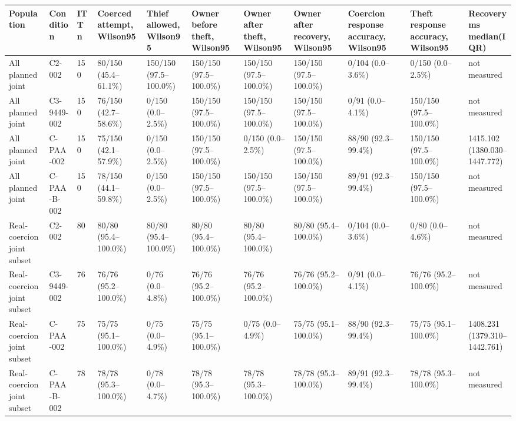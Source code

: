 \begin{tabular}{lllllllllll}
\hline
Population & Condition & ITT n & Coerced attempt, Wilson95 & Thief allowed, Wilson95 & Owner before theft, Wilson95 & Owner after theft, Wilson95 & Owner after recovery, Wilson95 & Coercion response accuracy, Wilson95 & Theft response accuracy, Wilson95 & Recovery ms median(IQR) \\
\hline
All planned joint & C2-002 & 150 & 80/150 (45.4--61.1\%) & 150/150 (97.5--100.0\%) & 150/150 (97.5--100.0\%) & 150/150 (97.5--100.0\%) & 150/150 (97.5--100.0\%) & 0/104 (0.0--3.6\%) & 0/150 (0.0--2.5\%) & not measured \\
All planned joint & C3-9449-002 & 150 & 76/150 (42.7--58.6\%) & 0/150 (0.0--2.5\%) & 150/150 (97.5--100.0\%) & 150/150 (97.5--100.0\%) & 150/150 (97.5--100.0\%) & 0/91 (0.0--4.1\%) & 150/150 (97.5--100.0\%) & not measured \\
All planned joint & C-PAA-002 & 150 & 75/150 (42.1--57.9\%) & 0/150 (0.0--2.5\%) & 150/150 (97.5--100.0\%) & 0/150 (0.0--2.5\%) & 150/150 (97.5--100.0\%) & 88/90 (92.3--99.4\%) & 150/150 (97.5--100.0\%) & 1415.102 (1380.030--1447.772) \\
All planned joint & C-PAA-B-002 & 150 & 78/150 (44.1--59.8\%) & 0/150 (0.0--2.5\%) & 150/150 (97.5--100.0\%) & 150/150 (97.5--100.0\%) & 150/150 (97.5--100.0\%) & 89/91 (92.3--99.4\%) & 150/150 (97.5--100.0\%) & not measured \\
Real-coercion joint subset & C2-002 & 80 & 80/80 (95.4--100.0\%) & 80/80 (95.4--100.0\%) & 80/80 (95.4--100.0\%) & 80/80 (95.4--100.0\%) & 80/80 (95.4--100.0\%) & 0/104 (0.0--3.6\%) & 0/80 (0.0--4.6\%) & not measured \\
Real-coercion joint subset & C3-9449-002 & 76 & 76/76 (95.2--100.0\%) & 0/76 (0.0--4.8\%) & 76/76 (95.2--100.0\%) & 76/76 (95.2--100.0\%) & 76/76 (95.2--100.0\%) & 0/91 (0.0--4.1\%) & 76/76 (95.2--100.0\%) & not measured \\
Real-coercion joint subset & C-PAA-002 & 75 & 75/75 (95.1--100.0\%) & 0/75 (0.0--4.9\%) & 75/75 (95.1--100.0\%) & 0/75 (0.0--4.9\%) & 75/75 (95.1--100.0\%) & 88/90 (92.3--99.4\%) & 75/75 (95.1--100.0\%) & 1408.231 (1379.310--1442.761) \\
Real-coercion joint subset & C-PAA-B-002 & 78 & 78/78 (95.3--100.0\%) & 0/78 (0.0--4.7\%) & 78/78 (95.3--100.0\%) & 78/78 (95.3--100.0\%) & 78/78 (95.3--100.0\%) & 89/91 (92.3--99.4\%) & 78/78 (95.3--100.0\%) & not measured \\
\hline
\end{tabular}
